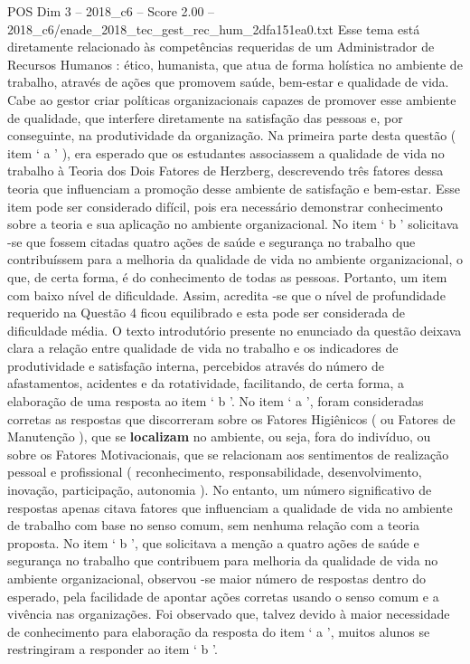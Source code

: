 \begin{textsample}{POS Dim 3 – 2018\_c6 – Score 2.00 – 2018\_c6/enade\_2018\_tec\_gest\_rec\_hum\_2dfa151ea0.txt}
Esse tema está diretamente relacionado às competências requeridas de um Administrador de Recursos Humanos : ético, humanista, que atua de forma holística no ambiente de trabalho, através de ações que promovem saúde, bem-estar e qualidade de vida.
Cabe ao gestor criar políticas organizacionais capazes de promover esse ambiente de qualidade, que interfere diretamente na satisfação das pessoas e, por conseguinte, na produtividade da organização.
Na primeira parte desta questão ( item ‘ a ’ ), era esperado que os estudantes associassem a qualidade de vida no trabalho à Teoria dos Dois Fatores de Herzberg, descrevendo três fatores dessa teoria que influenciam a promoção desse ambiente de satisfação e bem-estar.
Esse item pode ser considerado difícil, pois era necessário demonstrar conhecimento sobre a teoria e sua aplicação no ambiente organizacional.
No item ‘ b ’ solicitava -se que fossem citadas quatro ações de saúde e segurança no trabalho que contribuíssem para a melhoria da qualidade de vida no ambiente organizacional, o que, de certa forma, é do conhecimento de todas as pessoas.
Portanto, um item com baixo nível de dificuldade.
Assim, acredita -se que o nível de profundidade requerido na Questão 4 ficou equilibrado e esta pode ser considerada de dificuldade média.
O texto introdutório presente no enunciado da questão deixava clara a relação entre qualidade de vida no trabalho e os indicadores de produtividade e satisfação interna, percebidos através do número de afastamentos, acidentes e da rotatividade, facilitando, de certa forma, a elaboração de uma resposta ao item ‘ b ’.
No item ‘ a ’, foram consideradas corretas as respostas que discorreram sobre os Fatores Higiênicos ( ou Fatores de Manutenção ), que se \textbf{localizam} no ambiente, ou seja, fora do indivíduo, ou sobre os Fatores Motivacionais, que se relacionam aos sentimentos de realização pessoal e profissional ( reconhecimento, responsabilidade, desenvolvimento, inovação, participação, autonomia ).
No entanto, um número significativo de respostas apenas citava fatores que influenciam a qualidade de vida no ambiente de trabalho com base no senso comum, sem nenhuma relação com a teoria proposta.
No item ‘ b ’, que solicitava a menção a quatro ações de saúde e segurança no trabalho que contribuem para melhoria da qualidade de vida no ambiente organizacional, observou -se maior número de respostas dentro do esperado, pela facilidade de apontar ações corretas usando o senso comum e a vivência nas organizações.
Foi observado que, talvez devido à maior necessidade de conhecimento para elaboração da resposta do item ‘ a ’, muitos alunos se restringiram a responder ao item ‘ b ’.

\end{textsample}
